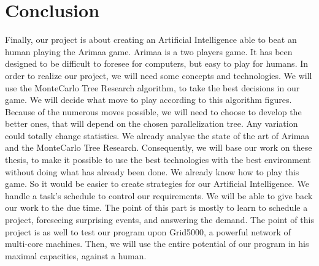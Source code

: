 \documentclass[12pt]{article}
\begin{document}
\section{Conclusion}
Finally, our project is about creating an Artificial Intelligence able to beat an human playing the Arimaa game.
\newline
\newline
Arimaa is a two players game. It has been designed to be difficult to foresee for computers, but easy to play for humans. 
In order to realize our project, we will need some concepts and technologies. 
We will use the MonteCarlo Tree Research algorithm, to take the best decisions in our game. We will decide what move to play according to this algorithm figures. Because of the numerous moves possible, we will need to choose to develop the better ones, that will depend on the chosen parallelization tree. Any variation could totally change statistics.
We already analyse the state of the art of Arimaa and the MonteCarlo Tree Research. Consequently, we will base our work on these thesis, to make it possible to use the best technologies with the best environment without doing what has already been done.
We already know how to play this game. So it would be easier to create strategies for our Artificial Intelligence. We handle a task's schedule to control our requirements. We will be able to give back our work to the due time. The point of this part is mostly to learn to schedule a project, foreseeing surprising events, and answering the demand.
\smallbreak
The point of this project is as well to test our program upon Grid5000, a powerful network of multi-core machines. Then, we will use the entire potential of our program in his maximal capacities, against a human.
\end{document}
